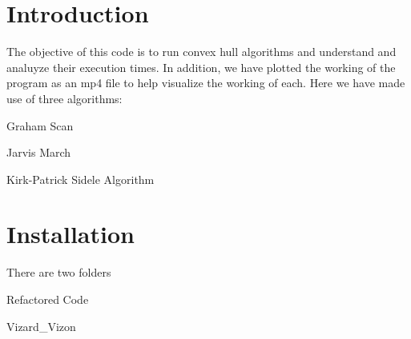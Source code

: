 \hypertarget{index_intro}{}\section{Introduction}\label{index_intro}
The objective of this code is to run convex hull algorithms and understand and analuyze their execution times. In addition, we have plotted the working of the program as an mp4 file to help visualize the working of each. Here we have made use of three algorithms\+:
\begin{DoxyItemize}
\item Graham Scan
\item Jarvis March
\item Kirk-\/\+Patrick Sidele Algorithm 
\end{DoxyItemize}\hypertarget{index_install}{}\section{Installation}\label{index_install}
There are two folders
\begin{DoxyItemize}
\item Refactored Code
\item Vizard\+\_\+\+Vizon
\end{DoxyItemize}

